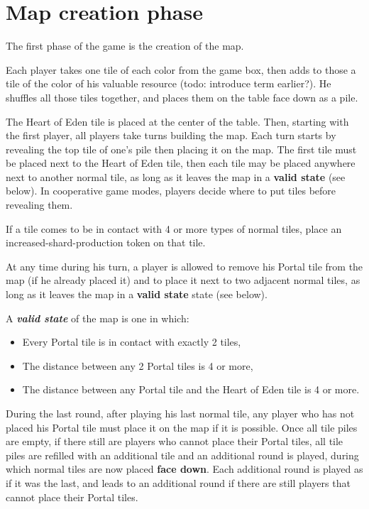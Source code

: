 \documentclass[a4paper]{article}
\begin{document}
\section{Map creation phase}

    The first phase of the game is the creation of the map.
    
    Each player takes one tile of each color from the game box,
    then adds to those a tile of the color of his valuable resource
    (todo: introduce term earlier?).
    He shuffles all those tiles together,
    and places them on the table face down as a pile.
    
    The Heart of Eden tile is placed at the center of the table.
    Then, starting with the first player, all players take turns building the map.
    Each turn starts by revealing the top tile of one's pile then placing it on the map.
    The first tile must be placed next to the Heart of Eden tile,
    then each tile may be placed anywhere next to another normal tile,
    as long as it leaves the map in a \textbf{valid state} (see below).
    In cooperative game modes, players decide where to put tiles before revealing them.
    
    If a tile comes to be in contact with 4 or more types of normal tiles,
    place an increased-shard-production token on that tile.
    
    At any time during his turn, a player is allowed to remove his Portal tile
    from the map (if he already placed it) and to place it next to two
    adjacent normal tiles, as long as it leaves the map in a
    \textbf{valid state} state (see below).  
    
    A \textbf{\textit{valid state}} of the map is one in which:
    \vspace{-1.3em}
    \begin{itemize}
        \item Every Portal tile is in contact with exactly 2 tiles,
        \item The distance between any 2 Portal tiles is 4 or more,
        \item The distance between any Portal tile and the Heart of Eden tile
        is 4 or more.
    \end{itemize}
    
    \vspace{-0.7em}
    During the last round, after playing his last normal tile,
    any player who has not placed his Portal tile must place it on the map
    if it is possible.
    Once all tile piles are empty, if there still are players who cannot
    place their Portal tiles, all tile piles are refilled with an additional tile
    and an additional round is played, during which normal tiles
    are now placed \textbf{face down}.
    Each additional round is played as if it was the last,
    and leads to an additional round if there are still players that cannot place
    their Portal tiles.
    
\end{document}
